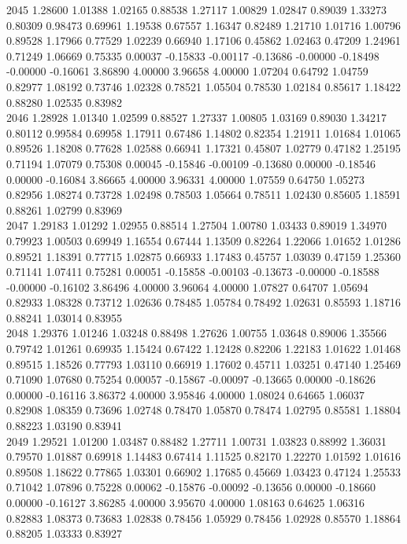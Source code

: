 {2045 1.28600 1.01388 1.02165 0.88538 1.27117 1.00829 1.02847 0.89039 1.33273 0.80309 0.98473 0.69961 1.19538 0.67557 1.16347 0.82489 1.21710 1.01716 1.00796 0.89528 1.17966 0.77529 1.02239 0.66940 1.17106 0.45862 1.02463 0.47209 1.24961 0.71249 1.06669 0.75335 0.00037 -0.15833 -0.00117 -0.13686 -0.00000 -0.18498 -0.00000 -0.16061 3.86890 4.00000 3.96658 4.00000 1.07204 0.64792 1.04759 0.82977 1.08192 0.73746 1.02328 0.78521 1.05504 0.78530 1.02184 0.85617 1.18422 0.88280 1.02535 0.83982 \\
2046 1.28928 1.01340 1.02599 0.88527 1.27337 1.00805 1.03169 0.89030 1.34217 0.80112 0.99584 0.69958 1.17911 0.67486 1.14802 0.82354 1.21911 1.01684 1.01065 0.89526 1.18208 0.77628 1.02588 0.66941 1.17321 0.45807 1.02779 0.47182 1.25195 0.71194 1.07079 0.75308 0.00045 -0.15846 -0.00109 -0.13680 0.00000 -0.18546 0.00000 -0.16084 3.86665 4.00000 3.96331 4.00000 1.07559 0.64750 1.05273 0.82956 1.08274 0.73728 1.02498 0.78503 1.05664 0.78511 1.02430 0.85605 1.18591 0.88261 1.02799 0.83969 \\
2047 1.29183 1.01292 1.02955 0.88514 1.27504 1.00780 1.03433 0.89019 1.34970 0.79923 1.00503 0.69949 1.16554 0.67444 1.13509 0.82264 1.22066 1.01652 1.01286 0.89521 1.18391 0.77715 1.02875 0.66933 1.17483 0.45757 1.03039 0.47159 1.25360 0.71141 1.07411 0.75281 0.00051 -0.15858 -0.00103 -0.13673 -0.00000 -0.18588 -0.00000 -0.16102 3.86496 4.00000 3.96064 4.00000 1.07827 0.64707 1.05694 0.82933 1.08328 0.73712 1.02636 0.78485 1.05784 0.78492 1.02631 0.85593 1.18716 0.88241 1.03014 0.83955 \\
2048 1.29376 1.01246 1.03248 0.88498 1.27626 1.00755 1.03648 0.89006 1.35566 0.79742 1.01261 0.69935 1.15424 0.67422 1.12428 0.82206 1.22183 1.01622 1.01468 0.89515 1.18526 0.77793 1.03110 0.66919 1.17602 0.45711 1.03251 0.47140 1.25469 0.71090 1.07680 0.75254 0.00057 -0.15867 -0.00097 -0.13665 0.00000 -0.18626 0.00000 -0.16116 3.86372 4.00000 3.95846 4.00000 1.08024 0.64665 1.06037 0.82908 1.08359 0.73696 1.02748 0.78470 1.05870 0.78474 1.02795 0.85581 1.18804 0.88223 1.03190 0.83941 \\
2049 1.29521 1.01200 1.03487 0.88482 1.27711 1.00731 1.03823 0.88992 1.36031 0.79570 1.01887 0.69918 1.14483 0.67414 1.11525 0.82170 1.22270 1.01592 1.01616 0.89508 1.18622 0.77865 1.03301 0.66902 1.17685 0.45669 1.03423 0.47124 1.25533 0.71042 1.07896 0.75228 0.00062 -0.15876 -0.00092 -0.13656 0.00000 -0.18660 0.00000 -0.16127 3.86285 4.00000 3.95670 4.00000 1.08163 0.64625 1.06316 0.82883 1.08373 0.73683 1.02838 0.78456 1.05929 0.78456 1.02928 0.85570 1.18864 0.88205 1.03333 0.83927 \\
}
